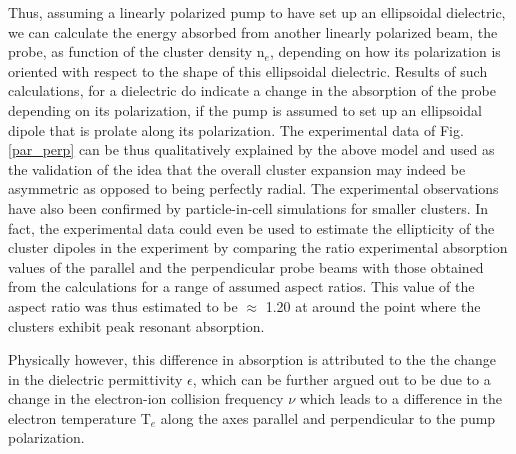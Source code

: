\documentclass[a4paper,12pt]{article}
\begin{document}
Thus, assuming a linearly polarized pump to have set up an ellipsoidal dielectric, we can calculate the energy absorbed from another linearly polarized beam, the probe, as function of the cluster density n$_{e}$, depending on how its polarization is oriented with respect to the shape of this ellipsoidal dielectric. Results of such calculations, for a dielectric do indicate a change in the absorption of the probe depending on its polarization, if the pump is assumed to set up an ellipsoidal dipole that is prolate along its polarization. The experimental data of Fig.\ref{par_perp} can be thus qualitatively explained by the above model and used as the validation of the idea that the overall cluster expansion may indeed be asymmetric as opposed to being perfectly radial. The experimental observations have also been confirmed by particle-in-cell simulations for smaller clusters. In fact, the experimental data could even be used to estimate the ellipticity of the cluster dipoles in the experiment by comparing the ratio experimental absorption values of the parallel and the perpendicular probe beams with those obtained from the calculations for a range of assumed aspect ratios. This value of the aspect ratio was thus estimated to be $\approx$ 1.20 at around the point where the clusters exhibit peak resonant absorption.

Physically however, this difference in absorption is attributed to the the change in the dielectric permittivity $\epsilon$, which can be further argued out to be due to a change in the electron-ion collision frequency $\nu$ which leads to a difference in the electron temperature T$_{e}$ along the axes parallel and perpendicular to the pump polarization.  
\end{document}
